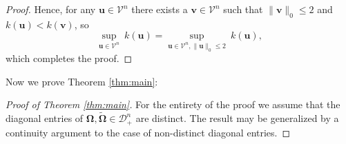 \documentclass[12pt]{article}
\newcommand{\bl}[1]{{\mathbf #1}}
\newcommand{\bs}[1]{\boldsymbol #1}
\begin{document}
\begin{proof}
Hence, for any $\bl{u} \in \mathcal{V}^n$ there exists a $\bl{v} \in \mathcal{V}^n$ such that $\|\bl{v}\|_0 \leq 2$ and $k(\bl{u}) < k(\bl{v})$, so
\begin{equation*}
    \sup_{\bl{u} \in \mathcal{V}^n}~k(\bl{u}) = \sup_{\bl{u} \in \mathcal{V}^n, \|\bl{u}\|_0 \leq 2}~k(\bl{u}), 
\end{equation*}
which completes the proof. 
\end{proof}

Now we prove Theorem \ref{thm:main}:
\begin{proof}[Proof of Theorem \ref{thm:main}]
For the entirety of the proof we assume that the diagonal entries of $\bs{\Omega}, \tilde{\bs{\Omega}} \in \mathcal{D}_+^n$ are distinct. The result may be generalized by a continuity argument to the case of non-distinct diagonal entries.


\end{proof}
\end{document}
